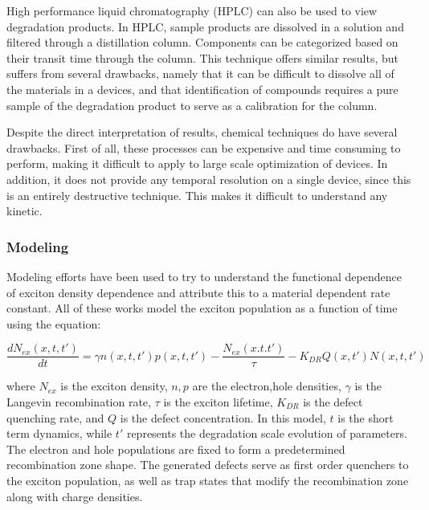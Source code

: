 \documentclass[../thesis.tex]{subfiles}
\begin{document}
High performance liquid chromatography (HPLC) can also be used to view degradation products.\supercite{Kondakov2007d,Sivasubramaniam2009}
In HPLC, sample products are dissolved in a solution and filtered through a distillation column.  
Components can be categorized based on their transit time through the column.
This technique offers similar results, but suffers from several drawbacks, namely that it can be difficult to dissolve all of the materials in a devices, and that identification of compounds requires a pure sample of the degradation product to serve as a calibration for the column.  

Despite the direct interpretation of results, chemical techniques do have several drawbacks.
First of all, these processes can be expensive and time consuming to perform, making it difficult to apply to large scale optimization of devices.
In addition, it does not provide any temporal resolution on a single device, since this is an entirely destructive technique.
This makes it difficult to understand any kinetic.

\subsubsection{Modeling}

Modeling efforts have been used to try to understand the functional dependence of exciton density dependence and attribute this to a material dependent rate constant.\supercite{Giebink2008a,Coburn2016a,Coburn2017,Peng2017}
All of these works model the exciton population as a function of time using the equation:

\begin{equation}
\frac{dN_{ex}(x,t,t')}{dt}=\gamma n(x,t,t')p(x,t,t')-\frac{N_{ex}(x.t.t')}{\tau}-K_{DR}Q(x,t')N(x,t,t')
\label{eqn:giebink_model_N}
\end{equation}

where $N_{ex}$ is the exciton density, $n,p$ are the electron,hole densities, $\gamma$ is the Langevin recombination rate, $\tau$ is the exciton lifetime, $K_{DR}$ is the defect quenching rate, and $Q$ is the defect concentration.  
In this model, $t$ is the short term dynamics, while $t'$ represents the degradation scale evolution of parameters.
The electron and hole populations are fixed to form a predetermined recombination zone shape.
The generated defects serve as first order quenchers to the exciton population, as well as trap states that modify the recombination zone along with charge densities.
\end{document}
